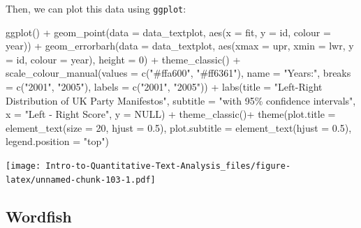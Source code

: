 \documentclass[
]{article}
\newenvironment{Shaded}{\begin{snugshade}}{\end{snugshade}}
\newcommand{\AttributeTok}[1]{\textcolor[rgb]{0.77,0.63,0.00}{#1}}
\newcommand{\ConstantTok}[1]{\textcolor[rgb]{0.00,0.00,0.00}{#1}}
\newcommand{\DecValTok}[1]{\textcolor[rgb]{0.00,0.00,0.81}{#1}}
\newcommand{\FloatTok}[1]{\textcolor[rgb]{0.00,0.00,0.81}{#1}}
\newcommand{\FunctionTok}[1]{\textcolor[rgb]{0.00,0.00,0.00}{#1}}
\newcommand{\NormalTok}[1]{#1}
\newcommand{\SpecialCharTok}[1]{\textcolor[rgb]{0.00,0.00,0.00}{#1}}
\newcommand{\StringTok}[1]{\textcolor[rgb]{0.31,0.60,0.02}{#1}}
\begin{document}
Then, we can plot this data using \texttt{ggplot}:

\begin{Shaded}
\begin{Highlighting}[]
\FunctionTok{ggplot}\NormalTok{() }\SpecialCharTok{+}
 \FunctionTok{geom\_point}\NormalTok{(}\AttributeTok{data =}\NormalTok{ data\_textplot, }\FunctionTok{aes}\NormalTok{(}\AttributeTok{x =}\NormalTok{ fit, }\AttributeTok{y =}\NormalTok{ id, }\AttributeTok{colour =}\NormalTok{ year)) }\SpecialCharTok{+}
 \FunctionTok{geom\_errorbarh}\NormalTok{(}\AttributeTok{data =}\NormalTok{ data\_textplot, }\FunctionTok{aes}\NormalTok{(}\AttributeTok{xmax =}\NormalTok{ upr, }\AttributeTok{xmin =}\NormalTok{ lwr, }\AttributeTok{y =}\NormalTok{ id, }\AttributeTok{colour =}\NormalTok{ year), }\AttributeTok{height =} \DecValTok{0}\NormalTok{) }\SpecialCharTok{+}
 \FunctionTok{theme\_classic}\NormalTok{() }\SpecialCharTok{+}
 \FunctionTok{scale\_colour\_manual}\NormalTok{(}\AttributeTok{values =} \FunctionTok{c}\NormalTok{(}\StringTok{"\#ffa600"}\NormalTok{, }\StringTok{"\#ff6361"}\NormalTok{),}
 \AttributeTok{name =} \StringTok{"Years:"}\NormalTok{,}
 \AttributeTok{breaks =} \FunctionTok{c}\NormalTok{(}\StringTok{"2001"}\NormalTok{, }\StringTok{"2005"}\NormalTok{),}
 \AttributeTok{labels =} \FunctionTok{c}\NormalTok{(}\StringTok{"2001"}\NormalTok{, }\StringTok{"2005"}\NormalTok{)) }\SpecialCharTok{+}
 \FunctionTok{labs}\NormalTok{(}\AttributeTok{title =} \StringTok{"Left{-}Right Distribution of UK Party Manifestos"}\NormalTok{,}
 \AttributeTok{subtitle =} \StringTok{"with 95\% confidence intervals"}\NormalTok{,}
 \AttributeTok{x =} \StringTok{"Left {-} Right Score"}\NormalTok{,}
 \AttributeTok{y =} \ConstantTok{NULL}\NormalTok{) }\SpecialCharTok{+}
 \FunctionTok{theme\_classic}\NormalTok{()}\SpecialCharTok{+}
 \FunctionTok{theme}\NormalTok{(}\AttributeTok{plot.title =} \FunctionTok{element\_text}\NormalTok{(}\AttributeTok{size =} \DecValTok{20}\NormalTok{, }\AttributeTok{hjust =} \FloatTok{0.5}\NormalTok{),}
 \AttributeTok{plot.subtitle =} \FunctionTok{element\_text}\NormalTok{(}\AttributeTok{hjust =} \FloatTok{0.5}\NormalTok{),}
 \AttributeTok{legend.position =} \StringTok{"top"}\NormalTok{)}
\end{Highlighting}
\end{Shaded}

\texttt{[image: Intro-to-Quantitative-Text-Analysis\_files/figure-latex/unnamed-chunk-103-1.pdf]}

\hypertarget{wordfish}{%
\subsection{Wordfish}\label{wordfish}}
\end{document}
